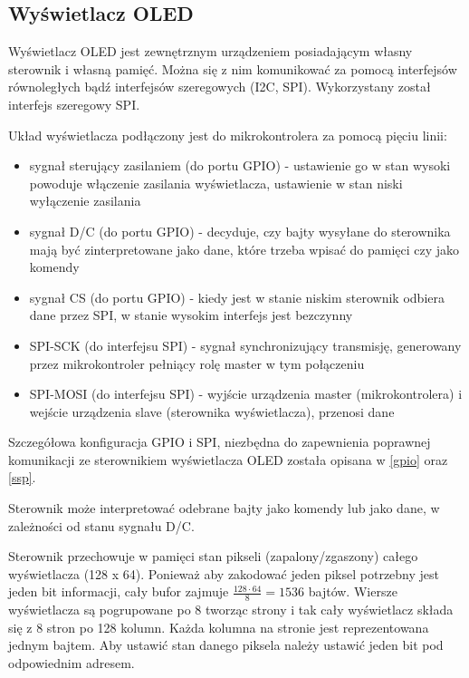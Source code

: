 \subsection{Wyświetlacz OLED} \label{oled}

Wyświetlacz OLED jest zewnętrznym urządzeniem posiadającym własny sterownik i własną pamięć. Można się z nim komunikować za pomocą interfejsów równoległych bądź interfejsów szeregowych (I2C, SPI). Wykorzystany został interfejs szeregowy SPI.

Układ wyświetlacza podłączony jest do mikrokontrolera za pomocą pięciu linii:
\begin{itemize}
    \item sygnał sterujący zasilaniem (do portu GPIO) - ustawienie go w stan wysoki powoduje włączenie zasilania wyświetlacza, ustawienie w stan niski wyłączenie zasilania
    \item sygnał D/C (do portu GPIO) - decyduje, czy bajty wysyłane do sterownika mają być zinterpretowane jako dane, które trzeba wpisać do pamięci czy jako komendy
    \item sygnał CS (do portu GPIO) - kiedy jest w stanie niskim sterownik odbiera dane przez SPI, w stanie wysokim interfejs jest bezczynny
    \item SPI-SCK (do interfejsu SPI) - sygnał synchronizujący transmisję, generowany przez mikrokontroler pełniący rolę master w tym połączeniu
    \item SPI-MOSI (do interfejsu SPI) - wyjście urządzenia master (mikrokontrolera) i wejście urządzenia slave (sterownika wyświetlacza), przenosi dane
\end{itemize}

Szczegółowa konfiguracja GPIO i SPI, niezbędna do zapewnienia poprawnej komunikacji ze sterownikiem wyświetlacza OLED została opisana w \ref{gpio} oraz \ref{ssp}.

Sterownik może interpretować odebrane bajty jako komendy lub jako dane, w zależności od stanu sygnału D/C.

Sterownik przechowuje w pamięci stan pikseli (zapalony/zgaszony) całego wyświetlacza (128 x 64). Ponieważ aby zakodować jeden piksel potrzebny jest jeden bit informacji, cały bufor zajmuje $\frac{128 \cdot 64}{8}=1536$ bajtów. Wiersze wyświetlacza są pogrupowane po 8 tworząc strony i tak cały wyświetlacz składa się z 8 stron po 128 kolumn. Każda kolumna na stronie jest reprezentowana jednym bajtem. Aby ustawić stan danego piksela należy ustawić jeden bit pod odpowiednim adresem.

